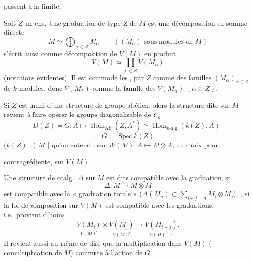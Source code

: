 \documentclass[11pt,a4paper]{article}
\begin{document}
passent à la limite.

Soit \struck{\ill{}} $Z$ un ens. Une graduation de type $Z$ de $M$ est une décomposition en somme directe
\[
  M \simeq \bigoplus_{\alpha \in Z} M_\alpha \qquad ((M_\alpha) \text{ sous-modules de } M)
\]
\struck{\ill{}} s'écrit aussi comme décomposition de $V(M)$ en produit
\[
  V(M) \simeq \prod_{\alpha \in Z} V(M_\alpha)
\]
(notations évidentes). Il est  commode  \struck{\ill{}}  \ill{} les , par $Z$ comme des familles $(M_\alpha)_{\alpha \in Z}$ de $k$-modules, donc $V(M_*)$ comme la famille des $V(M_\alpha)$ $(\alpha \in Z)$.

Si $Z$ est muni d'une structure de groupe abélien, alors la structure dite sur $M$ revient à faire opérer le groupe diagonalisable de $\widehat{C}_k$
\[
  D(Z) = G : A \longmapsto \operatorname{Hom}_{\mathrm{Ab}}(Z, A^*) \simeq \operatorname{Hom}_{k\text{-alg}}(k(Z), A),
\]
\[
  G = \operatorname{Spec} k(Z)
\]
($k(Z)$ : )  $M$ [\ill{} \ill{} qu'on entend : sur $W(M) : A \mapsto M \otimes A$, \ill{} au choix pour

contragrédiente, sur $V(M)$].

Une structure de coalg.\ $\Delta$ sur $M$ est dite compatible avec la graduation, si
\[
  \Delta : M \longrightarrow M \otimes M
\]
est compatible avec la « graduation totale » ($\Delta(M_n) \subset \sum_{i+j=n} M_i \otimes M_j$), , si la loi de composition sur $V(M)$ est compatible avec les graduations, i.e.\ provient d'homs
\[
  \underset{V(M)^i}{V(M_i)} \times \underset{V(M)^j}{V(M_j)} \longrightarrow \underset{V(M)^{i+j}}{V(M_{i+j})} .
\]
Il revient aussi au même de dire que la multiplication dans $V(M)$ ( comultiplication de $M$) commute à l'action de $G$.
\end{document}
